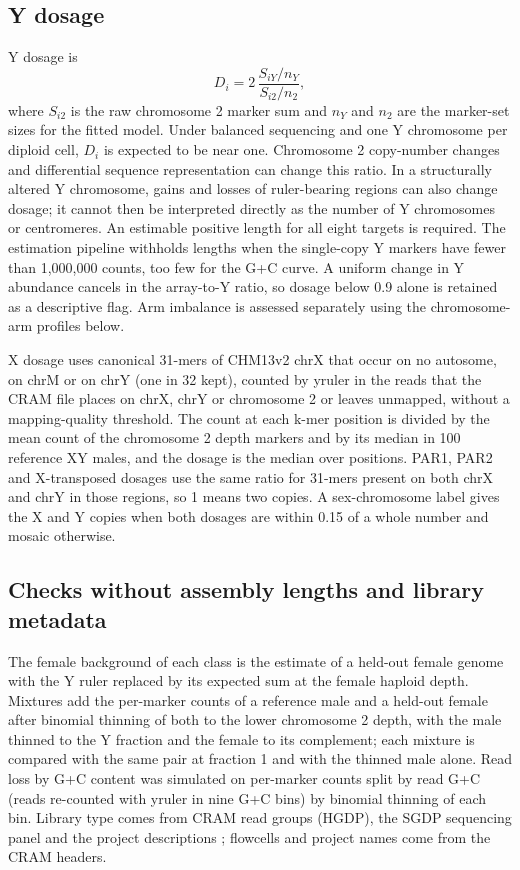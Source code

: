 \documentclass[pdflatex,sn-nature]{sn-jnl}
\begin{document}
\subsection{Y dosage}\label{sec:m-dosage}
Y dosage is
\begin{equation}
 D_i=2\,\frac{S_{iY}/n_Y}{S_{i2}/n_2},
\end{equation}
where $S_{i2}$ is the raw chromosome 2 marker sum and $n_Y$ and $n_2$ are the marker-set sizes for the fitted model. Under balanced sequencing and one Y chromosome per diploid cell, $D_i$ is expected to be near one. Chromosome 2 copy-number changes and differential sequence representation can change this ratio. In a structurally altered Y chromosome, gains and losses of ruler-bearing regions can also change dosage; it cannot then be interpreted directly as the number of Y chromosomes or centromeres. An estimable positive length for all eight targets is required. The estimation pipeline withholds lengths when the single-copy Y markers have fewer than 1,000,000 counts, too few for the G+C curve. A uniform change in Y abundance cancels in the array-to-Y ratio, so dosage below 0.9 alone is retained as a descriptive flag. Arm imbalance is assessed separately using the chromosome-arm profiles below.


X dosage uses canonical 31-mers of CHM13v2 chrX that occur on no autosome, on chrM or on chrY (one in 32 kept), counted by yruler in the reads that the CRAM file places on chrX, chrY or chromosome 2 or leaves unmapped, without a mapping-quality threshold. The count at each k-mer position is divided by the mean count of the chromosome 2 depth markers and by its median in 100 reference XY males, and the dosage is the median over positions. PAR1, PAR2 and X-transposed dosages use the same ratio for 31-mers present on both chrX and chrY in those regions, so 1 means two copies. A sex-chromosome label gives the X and Y copies when both dosages are within 0.15 of a whole number and mosaic otherwise.

\subsection{Checks without assembly lengths and library metadata}\label{sec:m-truthfree}
The female background of each class is the estimate of a held-out female genome with the Y ruler replaced by its expected sum at the female haploid depth. Mixtures add the per-marker counts of a reference male and a held-out female after binomial thinning of both to the lower chromosome 2 depth, with the male thinned to the Y fraction and the female to its complement; each mixture is compared with the same pair at fraction 1 and with the thinned male alone. Read loss by G+C content was simulated on per-marker counts split by read G+C (reads re-counted with yruler in nine G+C bins) by binomial thinning of each bin. Library type comes from CRAM read groups (HGDP), the SGDP sequencing panel and the project descriptions \cite{Bergstrom2020,Mallick2016,ByrskaBishop2022}; flowcells and project names come from the CRAM headers.
\end{document}

